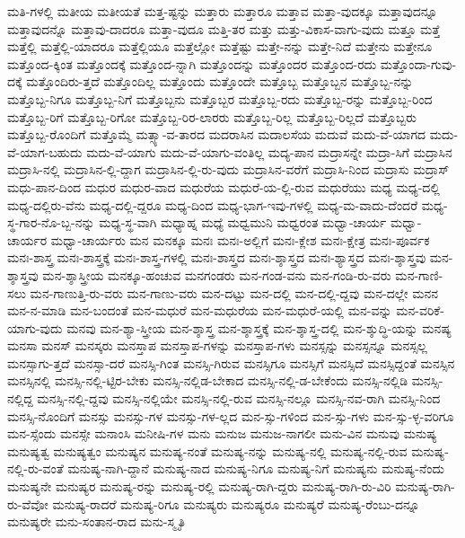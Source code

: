 {ಮತಿ-ಗಳಲ್ಲಿ
ಮತೀಯ
ಮತೀಯತೆ
ಮತ್ತ-ಷ್ಟನ್ನು
ಮತ್ತಾರು
ಮತ್ತಾರೂ
ಮತ್ತಾವ
ಮತ್ತಾ-ವುದಕ್ಕೂ
ಮತ್ತಾವುದನ್ನೂ
ಮತ್ತಾವುದನ್ನೊ
ಮತ್ತಾವು-ದಾದರೂ
ಮತ್ತಾ-ವುದೂ
ಮತ್ತಿ-ತರ
ಮತ್ತು
ಮತ್ತು-ವಿಕಾಸ-ವಾಗು-ವುದು
ಮತ್ತೂ
ಮತ್ತೆ
ಮತ್ತೆಲ್ಲಿ
ಮತ್ತೆಲ್ಲಿ-ಯಾದರೂ
ಮತ್ತೆಲ್ಲಿಯೂ
ಮತ್ತೆಲ್ಲೋ
ಮತ್ತೆಷ್ಟು
ಮತ್ತೇ-ನನ್ನು
ಮತ್ತೇ-ನಿದೆ
ಮತ್ತೇನು
ಮತ್ತೇನೂ
ಮತ್ತೊಂದ-ಕ್ಕಿಂತ
ಮತ್ತೊಂದಕ್ಕೆ
ಮತ್ತೊಂದ-ನ್ನಾಗಿ
ಮತ್ತೊಂದನ್ನು
ಮತ್ತೊಂದರ
ಮತ್ತೊಂದ-ರದು
ಮತ್ತೊಂದಾ-ಗುವು-ದಕ್ಕೆ
ಮತ್ತೊಂದಿರು-ತ್ತದೆ
ಮತ್ತೊಂದಿಲ್ಲ
ಮತ್ತೊಂದು
ಮತ್ತೊಂದೇ
ಮತ್ತೊಬ್ಬ
ಮತ್ತೊಬ್ಬನ
ಮತ್ತೊಬ್ಬ-ನನ್ನು
ಮತ್ತೊಬ್ಬ-ನಿಗೂ
ಮತ್ತೊಬ್ಬ-ನಿಗೆ
ಮತ್ತೊಬ್ಬನು
ಮತ್ತೊಬ್ಬರ
ಮತ್ತೊಬ್ಬ-ರದು
ಮತ್ತೊಬ್ಬ-ರನ್ನು
ಮತ್ತೊಬ್ಬ-ರಿಂದ
ಮತ್ತೊಬ್ಬ-ರಿಗೆ
ಮತ್ತೊಬ್ಬ-ರಿಗೋ
ಮತ್ತೊಬ್ಬ-ರಿರ-ಲಾರರು
ಮತ್ತೊಬ್ಬ-ರಿಲ್ಲ
ಮತ್ತೊಬ್ಬ-ರಿಲ್ಲದೆ
ಮತ್ತೊಬ್ಬರು
ಮತ್ತೊಬ್ಬ-ರೊಂದಿಗೆ
ಮತ್ತೊಮ್ಮೆ
ಮತ್ಸ್ಯಾ-ವ-ತಾರದ
ಮದರಾಸಿನ
ಮದಾಲಸೆಯ
ಮದುವೆ
ಮದು-ವೆ-ಯಾಗದ
ಮದು-ವೆ-ಯಾಗ-ಬಹುದು
ಮದು-ವೆ-ಯಾಗು
ಮದು-ವೆ-ಯಾಗು-ವಂತಿಲ್ಲ
ಮದ್ಯ-ಪಾನ
ಮದ್ರಾಸನ್ನೇ
ಮದ್ರಾ-ಸಿಗೆ
ಮದ್ರಾಸಿನ
ಮದ್ರಾಸಿ-ನಲ್ಲಿ
ಮದ್ರಾಸಿನ-ಲ್ಲಿ-ದ್ದಾಗ
ಮದ್ರಾಸಿನ-ಲ್ಲಿ-ರು-ವುದು
ಮದ್ರಾಸಿನ-ವರೆಗೆ
ಮದ್ರಾಸಿ-ನಿಂದ
ಮದ್ರಾಸು
ಮದ್ರಾಸ್
ಮಧು-ಪಾನ-ದಿಂದ
ಮಧುರ
ಮಧುರ-ವಾದ
ಮಧುರೆಯ
ಮಧುರೆ-ಯ-ಲ್ಲಿ-ರುವ
ಮಧುರೆಯು
ಮಧ್ಯ
ಮಧ್ಯ-ದಲ್ಲಿ
ಮಧ್ಯ-ದಲ್ಲಿರು-ವೆನು
ಮಧ್ಯ-ದಲ್ಲಿ-ದ್ದರೂ
ಮಧ್ಯ-ದಿಂದ
ಮಧ್ಯ-ಭಾಗ-ಇವು-ಗಳಲ್ಲಿ
ಮಧ್ಯ-ಮ-ವಾದು-ದೆಂದರೆ
ಮಧ್ಯ-ಸ್ಥ-ಗಾರ-ನೊ-ಬ್ಬ-ನನ್ನು
ಮಧ್ಯ-ಸ್ಥ-ವಾಗಿ
ಮಧ್ಯಾಹ್ನ
ಮಧ್ಯೆ
ಮಧ್ವಮುನಿ
ಮಧ್ವರಂತ
ಮಧ್ವಾ-ಚಾರ್ಯ
ಮಧ್ವಾ-ಚಾರ್ಯರ
ಮಧ್ವಾ-ಚಾರ್ಯರು
ಮನ
ಮನಕ್ಕೂ
ಮನಃ
ಮನಃ-ಅಲ್ಲಿಗೆ
ಮನಃ-ಕ್ಲೇಶ
ಮನಃ-ಕ್ಷೇತ್ರ
ಮನಃ-ಪೂರ್ವಕ
ಮನಃ-ಶಾಸ್ತ್ರ
ಮನಃ-ಶಾಸ್ತ್ರಕ್ಕೆ
ಮನಃ-ಶಾಸ್ತ್ರ-ಗಳಲ್ಲಿ
ಮನಃ-ಶಾಸ್ತ್ರದ
ಮನಃ-ಶ್ಶಾಸ್ತ್ರದ
ಮನಃ-ಶ್ಯಾಸ್ತ್ರದ
ಮನಃ-ಶ್ಶಾಸ್ತ್ರವು
ಮನ-ಶ್ಶಾಸ್ತ್ರವು
ಮನ-ಶ್ಶಾಸ್ತ್ರೀಯ
ಮನಕ್ಕೂ-ಹಂಚುವ
ಮನಗಂಡರು
ಮನ-ಗಂಡ-ವನು
ಮನ-ಗಂಡಿ-ರು-ವರು
ಮನ-ಗಾಣಿ-ಸಲು
ಮನ-ಗಾಣುತ್ತಿ-ರು-ವರು
ಮನ-ಗಾಣು-ವರು
ಮನ-ದಟ್ಟು
ಮನ-ದಲ್ಲಿ
ಮನ-ದಲ್ಲಿ-ದ್ದವು
ಮನ-ದಲ್ಲೇ
ಮನನ
ಮನ-ನ-ಮಾಡಿ
ಮನ-ಬಂದಂತೆ
ಮನ-ಮಧುರೆ
ಮನ-ಮಧುರೆಯ
ಮನ-ಮಧುರೆ-ಯಲ್ಲಿ
ಮನ-ವನ್ನು
ಮನ-ವರಿಕೆ-ಯಾಗು-ವುದು
ಮನವು
ಮನ-ಶ್ಯಾ-ಸ್ತ್ರೀಯ
ಮನ-ಶ್ಶಾಸ್ತ್ರ
ಮನ-ಶ್ಶಾಸ್ತ್ರಕ್ಕೆ
ಮನ-ಶ್ಶಾಸ್ತ್ರ-ದಲ್ಲಿ
ಮನ-ಶ್ಶುದ್ಧಿ-ಯನ್ನು
ಮನಷ್ಯ
ಮನಸಾ
ಮನಸ್
ಮನಸ್ಕರು
ಮನಸ್ತಾಪ
ಮನಸ್ತಾಪ-ಗಳನ್ನು
ಮನಸ್ತಾಪ-ಗಳು
ಮನಸ್ಸನ್ನು
ಮನಸ್ಸನ್ನೂ
ಮನಸ್ಸಲ್ಲ
ಮನಸ್ಸಾಗು-ತ್ತದೆ
ಮನಸ್ಸಾ-ದರೆ
ಮನಸ್ಸಿ-ಗಿಂತ
ಮನಸ್ಸಿ-ಗಿರುವ
ಮನಸ್ಸಿಗೂ
ಮನಸ್ಸಿಗೆ
ಮನಸ್ಸಿದೆ
ಮನಸ್ಸಿದ್ದಂತೆ
ಮನಸ್ಸಿನ
ಮನಸ್ಸಿನಲ್ಲಿ
ಮನಸ್ಸಿ-ನಲ್ಲಿ-ಟ್ಟಿರ-ಬೇಕು
ಮನಸ್ಸಿ-ನಲ್ಲಿಡ-ಬೇಕಾದ
ಮನಸ್ಸಿ-ನಲ್ಲಿ-ಡ-ಬೇಕೆಂದು
ಮನಸ್ಸಿ-ನಲ್ಲಿಡಿ
ಮನಸ್ಸಿ-ನಲ್ಲಿದ್ದ
ಮನಸ್ಸಿ-ನಲ್ಲಿ-ದ್ದವು
ಮನಸ್ಸಿ-ನಲ್ಲಿಯೇ
ಮನಸ್ಸಿ-ನಲ್ಲಿ-ರುವ
ಮನಸ್ಸಿ-ನಲ್ಲೂ
ಮನಸ್ಸಿ-ನವ-ರಾಗಿ
ಮನಸ್ಸಿ-ನಿಂದ
ಮನಸ್ಸಿ-ನೊಂದಿಗೆ
ಮನಸ್ಸು
ಮನಸ್ಸು-ಗಳ
ಮನಸ್ಸು-ಗಳ-ಲ್ಲದ
ಮನ-ಸ್ಸು-ಗಳಿಂದ
ಮನ-ಸ್ಸು-ಗಳು
ಮನ-ಸ್ಸು-ಳ್ಳ-ವರಿಗೂ
ಮನ-ಸ್ಸೆಂದು
ಮನಸ್ಸೇ
ಮನಾಂಸಿ
ಮನೀಷಿ-ಗಳ
ಮನು
ಮನುಜ
ಮನುಜ-ನಾಗಲೀ
ಮನು-ವಿನ
ಮನುವು
ಮನುಷ್ಯ
ಮನುಷ್ಯತ್ವ
ಮನುಷ್ಯತ್ವಂ
ಮನುಷ್ಯನ
ಮನುಷ್ಯ-ನಂತೆ
ಮನುಷ್ಯ-ನನ್ನು
ಮನುಷ್ಯ-ನಲ್ಲಿ
ಮನುಷ್ಯ-ನಲ್ಲಿ-ರುವ
ಮನುಷ್ಯ-ನಲ್ಲಿ-ರು-ವಂತೆ
ಮನುಷ್ಯ-ನಾಗಿ-ದ್ದಾನೆ
ಮನುಷ್ಯ-ನಾದ
ಮನುಷ್ಯ-ನಿಗೂ
ಮನುಷ್ಯ-ನಿಗೆ
ಮನುಷ್ಯನು
ಮನುಷ್ಯ-ನೆಂದು
ಮನುಷ್ಯನೇ
ಮನುಷ್ಯರ
ಮನುಷ್ಯ-ರನ್ನು
ಮನುಷ್ಯ-ರಲ್ಲಿ
ಮನುಷ್ಯ-ರಾಗಿ-ದ್ದರು
ಮನುಷ್ಯ-ರಾಗಿ-ರು-ವಿರಿ
ಮನುಷ್ಯ-ರಾಗಿ-ರು-ವೆವೋ
ಮನುಷ್ಯ-ರಾದರೆ
ಮನುಷ್ಯ-ರಿಗೂ
ಮನುಷ್ಯರು
ಮನುಷ್ಯರೂ
ಮನುಷ್ಯರೆ
ಮನುಷ್ಯ-ರೆಂಬು-ದನ್ನೂ
ಮನುಷ್ಯರೇ
ಮನು-ಸಂತಾನ-ರಾದ
ಮನು-ಸ್ಮೃತಿ
}
